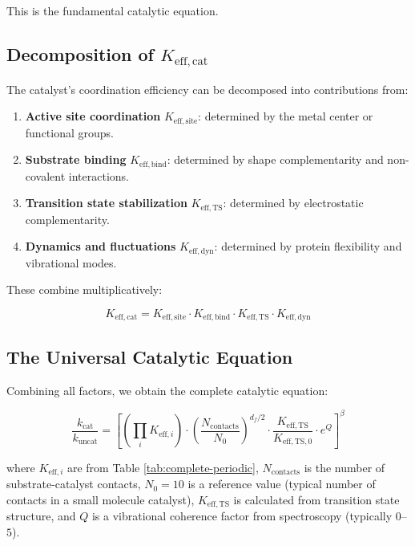 \documentclass[12pt,a4paper]{article}
\theoremstyle{remark}
\newcommand{\df}{d_{\!f}}
\begin{document}
	This is the fundamental catalytic equation.
	
	\subsection{Decomposition of $K_{\mathrm{eff},\text{cat}}$}
	
	The catalyst's coordination efficiency can be decomposed into contributions from:
	\begin{enumerate}
		\item \textbf{Active site coordination} $K_{\mathrm{eff},\text{site}}$: determined by the metal center or functional groups.
		\item \textbf{Substrate binding} $K_{\mathrm{eff},\text{bind}}$: determined by shape complementarity and non-covalent interactions.
		\item \textbf{Transition state stabilization} $K_{\mathrm{eff},\text{TS}}$: determined by electrostatic complementarity.
		\item \textbf{Dynamics and fluctuations} $K_{\mathrm{eff},\text{dyn}}$: determined by protein flexibility and vibrational modes.
	\end{enumerate}
	
	These combine multiplicatively:
	
	\begin{equation}
		K_{\mathrm{eff},\text{cat}} = K_{\mathrm{eff},\text{site}} \cdot K_{\mathrm{eff},\text{bind}} \cdot K_{\mathrm{eff},\text{TS}} \cdot K_{\mathrm{eff},\text{dyn}}
		\label{eq:keff-cat}
	\end{equation}
	
	\subsection{The Universal Catalytic Equation}
	
	Combining all factors, we obtain the complete catalytic equation:
	
	\begin{equation}
		\boxed{\frac{k_{\text{cat}}}{k_{\text{uncat}}} = \left[ \left(\prod_i K_{\mathrm{eff},i}\right) \cdot \left(\frac{N_{\text{contacts}}}{N_0}\right)^{\df/2} \cdot \frac{K_{\mathrm{eff},\text{TS}}}{K_{\mathrm{eff},\text{TS},0}} \cdot e^{Q} \right]^{\beta}}
		\label{eq:cat-universal}
	\end{equation}
	
	where $K_{\mathrm{eff},i}$ are from Table \ref{tab:complete-periodic}, $N_{\text{contacts}}$ is the number of substrate-catalyst contacts, $N_0 = 10$ is a reference value (typical number of contacts in a small molecule catalyst), $K_{\mathrm{eff},\text{TS}}$ is calculated from transition state structure, and $Q$ is a vibrational coherence factor from spectroscopy (typically $0$--$5$).
	
\end{document}
